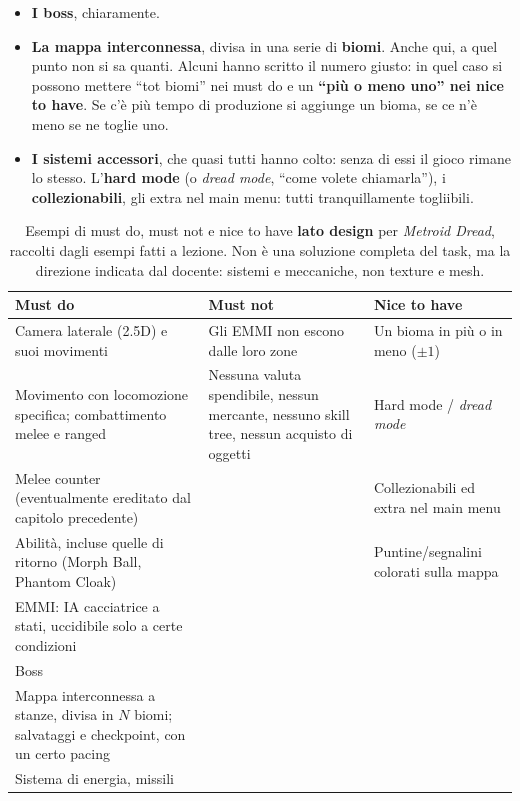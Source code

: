 \begin{itemize}
        posteriori, quindi si può segnare nei \textbf{must not}: gli EMMI
        \textbf{non possono uscire} dalle loro zone.
  \item \textbf{I boss}, chiaramente.
  \item \textbf{La mappa interconnessa}, divisa in una serie di
        \textbf{biomi}. Anche qui, a quel punto non si sa quanti. Alcuni
        hanno scritto il numero giusto: in quel caso si possono mettere
        ``tot biomi'' nei must do e un \textbf{``più o meno uno'' nei nice
        to have}. Se c'è più tempo di produzione si aggiunge un bioma, se ce
        n'è meno se ne toglie uno.
  \item \textbf{I sistemi accessori}, che quasi tutti hanno colto: senza di
        essi il gioco rimane lo stesso. L'\textbf{hard mode} (o \emph{dread
        mode}, ``come volete chiamarla''), i \textbf{collezionabili}, gli
        extra nel main menu: tutti tranquillamente togliibili.
\end{itemize}

\begin{table}[htbp]
  \centering
  \small
  \begin{tabular}{@{}p{}p{}p{}@{}}
    \toprule
    \textbf{Must do} & \textbf{Must not} & \textbf{Nice to have} \\
    \midrule
    Camera laterale (2.5D) e suoi movimenti &
    Gli EMMI non escono dalle loro zone &
    Un bioma in più o in meno ($\pm 1$) \\
    Movimento con locomozione specifica; combattimento melee e ranged &
    Nessuna valuta spendibile, nessun mercante, nessuno skill tree,
    nessun acquisto di oggetti &
    Hard mode / \emph{dread mode} \\
    Melee counter (eventualmente ereditato dal capitolo precedente) & &
    Collezionabili ed extra nel main menu \\
    Abilità, incluse quelle di ritorno (Morph Ball, Phantom Cloak) & &
    Puntine/segnalini colorati sulla mappa \\
    EMMI: IA cacciatrice a stati, uccidibile solo a certe condizioni & & \\
    Boss & & \\
    Mappa interconnessa a stanze, divisa in $N$ biomi; salvataggi e
    checkpoint, con un certo pacing & & \\
    Sistema di energia, missili & & \\
    \bottomrule
  \end{tabular}
  \caption{Esempi di must do, must not e nice to have \textbf{lato design}
  per \emph{Metroid Dread}, raccolti dagli esempi fatti a lezione. Non è una
  soluzione completa del task, ma la direzione indicata dal docente:
  sistemi e meccaniche, non texture e mesh.}
  \label{gd15:tab:must-dread}
\end{table}

